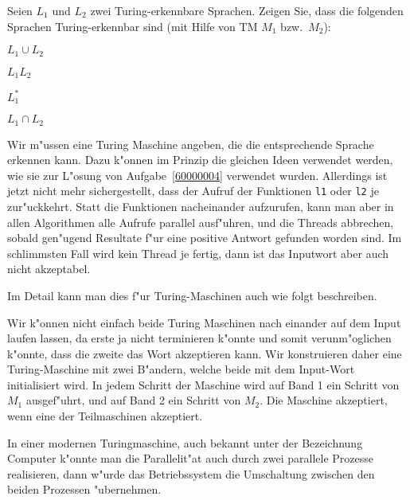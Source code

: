 Seien $L_1$ und $L_2$ zwei Turing-erkennbare Sprachen. Zeigen Sie, dass
die folgenden Sprachen Turing-erkennbar sind (mit Hilfe von TM $M_1$
bzw.~$M_2$):
\begin{teilaufgaben}
\item $L_1\cup L_2$
\item $L_1L_2$
\item $L_1^*$
\item $L_1\cap L_2$
\end{teilaufgaben}

\begin{loesung}
Wir m"ussen eine Turing Maschine angeben, die die entsprechende
Sprache erkennen kann.
Dazu k"onnen im Prinzip die gleichen Ideen verwendet werden, wie sie
zur L"osung von Aufgabe~\ref{60000004} verwendet wurden.
Allerdings ist jetzt nicht mehr sichergestellt, dass der Aufruf
der Funktionen \texttt{l1} oder \texttt{l2} je zur"uckkehrt.
Statt die Funktionen nacheinander aufzurufen, kann man aber in allen
Algorithmen alle Aufrufe parallel ausf"uhren, und die Threads abbrechen,
sobald gen"ugend Resultate f"ur eine positive Antwort gefunden worden
sind. Im schlimmsten Fall wird kein Thread je fertig, dann ist das
Inputwort aber auch nicht akzeptabel.

Im Detail kann man dies f"ur Turing-Maschinen auch wie folgt
beschreiben.
\begin{teilaufgaben}
\item Wir k"onnen nicht einfach beide Turing Maschinen nach einander
auf dem Input laufen lassen, da erste ja nicht terminieren k"onnte und
somit verunm"oglichen k"onnte, dass die zweite das Wort akzeptieren kann.
Wir konstruieren daher eine Turing-Maschine mit zwei B"andern, welche
beide mit dem Input-Wort initialisiert wird. In jedem Schritt der
Maschine wird auf Band 1 ein Schritt von $M_1$ ausgef"uhrt,
und auf Band 2 ein Schritt von $M_2$.
Die Maschine akzeptiert, wenn eine der Teilmaschinen
akzeptiert.

In einer modernen Turingmaschine, auch bekannt unter der Bezeichnung
Computer k"onnte man die Parallelit"at auch durch zwei parallele
Prozesse realisieren, dann w"urde das Betriebssystem die Umschaltung
zwischen den beiden Prozessen "ubernehmen.


\end{teilaufgaben}
\end{loesung}
